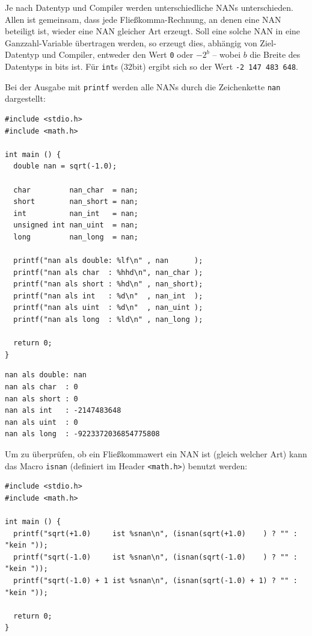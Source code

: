 Je nach Datentyp und Compiler werden unterschiedliche NANs unterschieden. Allen ist gemeinsam, dass jede Fließkomma-Rechnung, an denen eine NAN beteiligt ist, wieder eine NAN gleicher Art erzeugt. Soll eine solche NAN in eine Ganzzahl-Variable übertragen werden, so erzeugt dies, abhängig von Ziel-Datentyp und Compiler, entweder den Wert \texttt{0} oder $-2^{b}$ -- wobei $b$ die Breite des Datentyps in bits ist. Für \texttt{int}s (32bit) ergibt sich so der Wert \texttt{-2\,147\,483\,648}.

Bei der Ausgabe mit \texttt{printf} werden alle NANs durch die Zeichenkette \texttt{nan} dargestellt:
\begin{codebox}
\begin{verbatim}
#include <stdio.h>
#include <math.h>

int main () {
  double nan = sqrt(-1.0);
  
  char         nan_char  = nan;
  short        nan_short = nan;
  int          nan_int   = nan;
  unsigned int nan_uint  = nan;
  long         nan_long  = nan;
  
  printf("nan als double: %lf\n" , nan      );
  printf("nan als char  : %hhd\n", nan_char );
  printf("nan als short : %hd\n" , nan_short);
  printf("nan als int   : %d\n"  , nan_int  );
  printf("nan als uint  : %d\n"  , nan_uint );
  printf("nan als long  : %ld\n" , nan_long );
  
  return 0;
}
\end{verbatim}
\end{codebox}

\begin{cmdbox}
\begin{verbatim}
nan als double: nan
nan als char  : 0
nan als short : 0
nan als int   : -2147483648
nan als uint  : 0
nan als long  : -9223372036854775808
\end{verbatim}
\end{cmdbox}

Um zu überprüfen, ob ein Fließkommawert ein NAN ist (gleich welcher Art) kann das Macro \texttt{isnan} (definiert im Header \texttt{<math.h>}) benutzt werden:

\begin{codebox}
\begin{verbatim}
#include <stdio.h>
#include <math.h>

int main () {
  printf("sqrt(+1.0)     ist %snan\n", (isnan(sqrt(+1.0)    ) ? "" : "kein "));
  printf("sqrt(-1.0)     ist %snan\n", (isnan(sqrt(-1.0)    ) ? "" : "kein "));
  printf("sqrt(-1.0) + 1 ist %snan\n", (isnan(sqrt(-1.0) + 1) ? "" : "kein "));
  
  return 0;
}
\end{verbatim}
\end{codebox}

